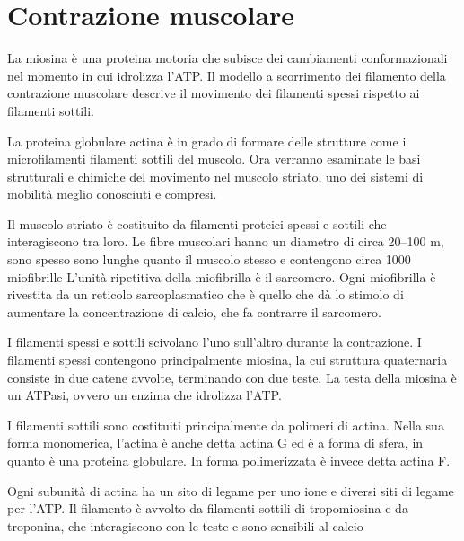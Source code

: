 \chapter{Contrazione muscolare}


La miosina è una proteina motoria che subisce dei cambiamenti conformazionali nel momento in cui idrolizza l'ATP.
Il modello a scorrimento dei filamento della contrazione muscolare descrive il movimento dei filamenti spessi rispetto ai filamenti sottili.

La proteina globulare actina è in grado di formare delle strutture come i microfilamenti filamenti sottili del muscolo.
Ora verranno esaminate le basi strutturali e chimiche del movimento nel muscolo striato, uno dei sistemi di mobilità meglio conosciuti e compresi.

Il muscolo striato è costituito da filamenti proteici spessi e sottili che interagiscono tra loro.
Le fibre muscolari hanno un diametro di circa 20--100 \mu m, sono spesso sono lunghe quanto il muscolo stesso e contengono circa 1000 miofibrille
L'unità ripetitiva della miofibrilla è il sarcomero. Ogni miofibrilla è rivestita da un reticolo sarcoplasmatico che è quello che dà lo stimolo di aumentare la concentrazione di calcio, che fa contrarre il sarcomero.



I filamenti spessi e sottili scivolano l'uno sull'altro durante la contrazione. I filamenti spessi contengono principalmente miosina, la cui struttura quaternaria consiste in due catene avvolte, terminando con due teste.
La testa della miosina è un ATPasi, ovvero un enzima che idrolizza l'ATP.{}

I filamenti sottili sono costituiti principalmente da polimeri di actina. Nella sua forma monomerica, l'actina è anche detta actina G ed è a forma di sfera, in quanto è una proteina globulare.
In forma polimerizzata è invece detta actina F.

Ogni subunità di actina ha un sito di legame per uno ione  e diversi siti di legame per l'ATP.{}
Il filamento è avvolto da filamenti sottili di tropomiosina e da troponina, che interagiscono con le teste e sono sensibili al calcio


